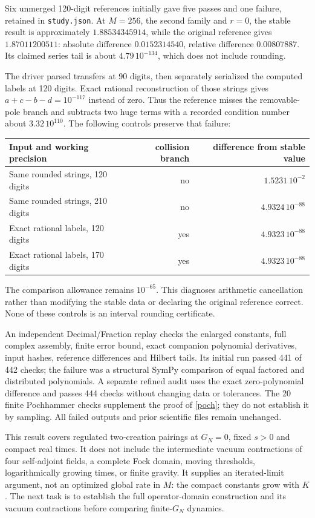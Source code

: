 \documentclass[11pt,a4paper]{article}
\begin{document}
Six unmerged 120-digit references initially gave five passes and one
failure, retained in \texttt{study.json}. At $M=256$, the second family
and $r=0$, the stable result is approximately $1.88534345914$,
while the original reference gives $1.87011200511$:
absolute difference $0.0152314540$, relative difference $0.00807887$.
Its claimed series tail is about $4.79\,10^{-134}$, which does not
include rounding.

The driver parsed transfers at 90 digits, then separately serialized
the computed labels at 120 digits. Exact rational reconstruction of
those strings gives $a+c-b-d=10^{-117}$ instead of zero.
Thus the reference misses the removable-pole branch and subtracts
two huge terms with a recorded condition number about $3.32\,10^{110}$.
The following controls preserve that failure:
\begin{center}
\begin{tabular}{lrr}
\toprule
Input and working precision & collision branch & difference from stable value\\
\midrule
Same rounded strings, 120 digits & no & $1.5231\,10^{-2}$\\
Same rounded strings, 210 digits & no & $4.9324\,10^{-88}$\\
Exact rational labels, 120 digits & yes & $4.9323\,10^{-88}$\\
Exact rational labels, 170 digits & yes & $4.9323\,10^{-88}$\\
\bottomrule
\end{tabular}
\end{center}
The comparison allowance remains $10^{-65}$.
This diagnoses arithmetic cancellation rather than modifying the
stable data or declaring the original reference correct.
None of these controls is an interval rounding certificate.

An independent Decimal/Fraction replay checks the enlarged constants,
full complex assembly, finite error bound, exact companion polynomial
derivatives, input hashes, reference differences and Hilbert tails.
Its initial run passed 441 of 442 checks; the failure was a structural
SymPy comparison of equal factored and distributed polynomials.
A separate refined audit uses the exact zero-polynomial difference
and passes 444 checks without changing data or tolerances.
The 20 finite Pochhammer checks supplement the proof of \eqref{poch};
they do not establish it by sampling.
All failed outputs and prior scientific files remain unchanged.

This result covers regulated two-creation pairings at $G_N=0$,
fixed $s>0$ and compact real times. It does not include the intermediate
vacuum contractions of four self-adjoint fields, a complete Fock
domain, moving thresholds, logarithmically growing times, or finite
gravity. It supplies an iterated-limit argument, not an optimized
global rate in $M$: the compact constants grow with $K$.
The next task is to establish the full operator-domain construction
and its vacuum contractions before comparing finite-$G_N$ dynamics.
\end{document}
